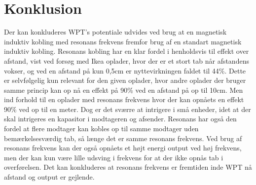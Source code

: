 \section{Konklusion}
Der kan konkluderes WPT's potentiale udvides ved brug at en magnetisk induktiv kobling med resonans frekvens fremfor brug af en standart magnetisk induktiv kobling. Resonans kobling har en klar fordel i henholdsvis til effekt over afstand, vist ved forsøg med Ikea oplader, hvor der er et stort tab når afstandens vokser, og ved en afstand på kun 0,5cm er nyttevirkningen faldet til 44\%. Dette er selvfølgelig kun relevant for den given oplader, hvor andre oplader der bruger samme princip kan op nå en effekt på 90\% ved en afstand på op til 10cm. Men ind forhold til en oplader med resonans frekvens hvor der kan opnåets en effekt 90\% ved op til en meter. Dog er det sværre at intrigere i små enheder, idet at der skal intrigeres en kapasitor i modtageren og afsender. Resonans har også den fordel at flere modtager kan kobles op til samme modtager uden bemærkelsesværdig tab, så længe det er samme resonans frekvens. Ved brug af resonans frekvens kan der også opnåets et højt energi output ved høj frekvens, men der kan kun være lille udsving i frekvens for at der ikke opnås tab i overførelsen. Det kan konkluderes at resonans frekvens er fremtiden inde WPT nå afstand og output er gejlende. 